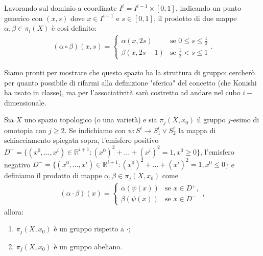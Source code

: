 Lavorando sul dominio a coordinate $I^i = I^{i-1} \times [0,1]$, indicando un punto generico con $(x, s)$ dove $x \in I^{i-1}$ e $s \in [0,1]$, il prodotto di due mappe $\alpha, \beta \in \pi_i(X)$ è così definito:
\begin{align}
    (\alpha \circ \beta)(x, s) = \begin{cases}
        \alpha(x, 2s) & \text{se } 0 \leq s \leq \frac{1}{2} \\
        \beta(x, 2s-1) & \text{se } \frac{1}{2} < s \leq 1
    \end{cases}.
\end{align}

Siamo pronti per mostrare che questo spazio ha la struttura di gruppo: cercherò per quanto possibile di rifarmi alla definizione "sferica" del concetto (che Konishi ha usato in classe), ma per l'associatività sarò costretto ad andare nel cubo $i-$dimensionale.
\begin{theorem}
    Sia $X$ uno spazio topologico (o una varietà) e sia $\pi_j(X, x_0)$ il gruppo $j$-esimo di omotopia con $j \geq 2$. Se indichiamo con $\psi: S^i \to S^i_1 \vee S^i_2$ la mappa di schiacciamento spiegata sopra, l'emisfero positivo $D^+=\{(x^0, \ldots, x^{i}) \in \mathbb{R}^{i+1}: (x^0)^2 + \ldots + (x^i)^2 = 1, x^0 \geq 0 \}$, l'emisfero negativo $D^-=\{ (x^0, \ldots, x^{i}) \in \mathbb{R}^{i+1}: (x^0)^2 + \ldots + (x^i)^2 = 1, x^0 \leq 0 \}$ e definiamo il prodotto di mappe $\alpha, \beta \in \pi_j(X, x_0)$ come
    \begin{align}
        (\alpha \cdot \beta)(x) = \begin{cases}
            \alpha(\psi(x)) & \text{se } x \in D^+, \\
            \beta(\psi(x)) & \text{se } x \in D^-
        \end{cases},
    \end{align} 
    allora:
    \begin{enumerate}[label=\protect\circled{\arabic*}]
        \item $\pi_j(X, x_0)$ è un gruppo rispetto a $\cdot$;
        \item $\pi_j(X, x_0)$ è un gruppo abeliano. 
    \end{enumerate}
\end{theorem}
